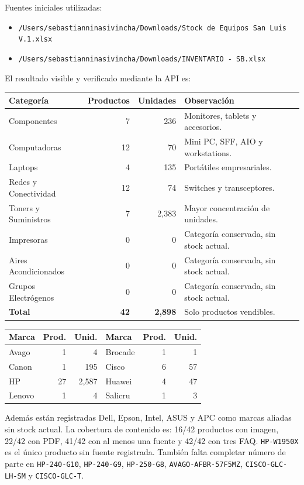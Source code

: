 \documentclass[11pt,a4paper]{article}
\newcommand{\code}[1]{\nolinkurl{#1}}
\begin{document}
Fuentes iniciales utilizadas:
\begin{itemize}
  \item \code{/Users/sebastianninasivincha/Downloads/Stock de Equipos San Luis V.1.xlsx}
  \item \code{/Users/sebastianninasivincha/Downloads/INVENTARIO - SB.xlsx}
\end{itemize}

El resultado visible y verificado mediante la API es:

\begin{tabularx}{\textwidth}{L{5.6cm}r r Y}
\toprule
\textbf{Categoría} & \textbf{Productos} & \textbf{Unidades} & \textbf{Observación}\\
\midrule
Componentes & 7 & 236 & Monitores, tablets y accesorios.\\
Computadoras & 12 & 70 & Mini PC, SFF, AIO y workstations.\\
Laptops & 4 & 135 & Portátiles empresariales.\\
Redes y Conectividad & 12 & 74 & Switches y transceptores.\\
Toners y Suministros & 7 & 2,383 & Mayor concentración de unidades.\\
Impresoras & 0 & 0 & Categoría conservada, sin stock actual.\\
Aires Acondicionados & 0 & 0 & Categoría conservada, sin stock actual.\\
Grupos Electrógenos & 0 & 0 & Categoría conservada, sin stock actual.\\
\midrule
\textbf{Total} & \textbf{42} & \textbf{2,898} & Solo productos vendibles.\\
\bottomrule
\end{tabularx}

\begin{tabularx}{\textwidth}{L{3.4cm}r r L{3.4cm}r r}
\toprule
\textbf{Marca} & \textbf{Prod.} & \textbf{Unid.} & \textbf{Marca} & \textbf{Prod.} & \textbf{Unid.}\\
\midrule
Avago & 1 & 4 & Brocade & 1 & 1\\
Canon & 1 & 195 & Cisco & 6 & 57\\
HP & 27 & 2,587 & Huawei & 4 & 47\\
Lenovo & 1 & 4 & Salicru & 1 & 3\\
\bottomrule
\end{tabularx}

Además están registradas Dell, Epson, Intel, ASUS y APC como marcas aliadas sin stock actual. La cobertura de contenido es: 16/42 productos con imagen, 22/42 con PDF, 41/42 con al menos una fuente y 42/42 con tres FAQ. \code{HP-W1950X} es el único producto sin fuente registrada. También falta completar número de parte en \code{HP-240-G10}, \code{HP-240-G9}, \code{HP-250-G8}, \code{AVAGO-AFBR-57F5MZ}, \code{CISCO-GLC-LH-SM} y \code{CISCO-GLC-T}.
\end{document}
